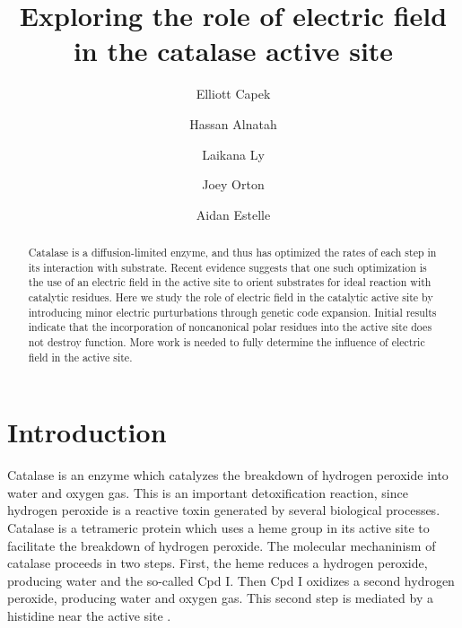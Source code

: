 \documentclass[journal=jacsat,manuscript=article]{achemso}
\author{Elliott Capek}
\affiliation{Department of Biochemistry, Oregon State University}
\author{Hassan Alnatah}
\author{Laikana Ly}
\author{Joey Orton}
\author{Aidan Estelle}
\title[]{Exploring the role of electric field in the catalase active site}
\begin{document}
\begin{abstract}
  Catalase is a diffusion-limited enzyme, and thus has optimized the rates of each step in its interaction with substrate. Recent evidence suggests that one such optimization is the use of an electric field in the active site to orient substrates for ideal reaction with catalytic residues. Here we study the role of electric field in the catalytic active site by introducing minor electric purturbations through genetic code expansion. Initial results indicate that the incorporation of noncanonical polar residues into the active site does not destroy function. More work is needed to fully determine the influence of electric field in the active site.\\
\end{abstract}

\section{Introduction}
Catalase is an enzyme which catalyzes the breakdown of hydrogen peroxide into water and oxygen gas. This is an important detoxification reaction, since hydrogen peroxide is a reactive toxin generated by several biological processes. Catalase is a tetrameric protein which uses a heme group in its active site to facilitate the breakdown of hydrogen peroxide. The molecular mechaninism of catalase proceeds in two steps. First, the heme reduces a hydrogen peroxide, producing water and the so-called Cpd I. Then Cpd I oxidizes a second hydrogen peroxide, producing water and oxygen gas. This second step is mediated by a histidine near the active site \cite{alfonso-prieto}.
\end{document}
